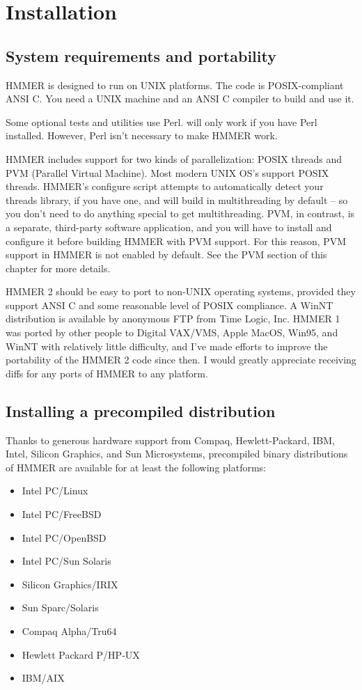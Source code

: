 \chapter{Installation}

\section{System requirements and portability}

HMMER is designed to run on UNIX platforms. The code is
POSIX-compliant ANSI C.  You need a UNIX machine and an ANSI C
compiler to build and use it.

Some optional tests and utilities use Perl.  will only
work if you have Perl installed. However, Perl isn't necessary to make
HMMER work.

HMMER includes support for two kinds of parallelization: POSIX threads
and PVM (Parallel Virtual Machine). Most modern UNIX OS's support
POSIX threads. HMMER's configure script attempts to automatically
detect your threads library, if you have one, and will build in
multithreading by default -- so you don't need to do anything special
to get multithreading. PVM, in contrast, is a separate, third-party
software application, and you will have to install and configure it
before building HMMER with PVM support. For this reason, PVM support
in HMMER is not enabled by default. See the PVM section of this
chapter for more details.

HMMER 2 should be easy to port to non-UNIX operating systems, provided
they support ANSI C and some reasonable level of POSIX compliance.  A
WinNT distribution is available by anonymous FTP from Time Logic,
Inc. HMMER 1 was ported by other people to Digital VAX/VMS, Apple
MacOS, Win95, and WinNT with relatively little difficulty, and I've
made efforts to improve the portability of the HMMER 2 code since
then. I would greatly appreciate receiving diffs for any ports of
HMMER to any platform.

\section{Installing a precompiled distribution}

Thanks to generous hardware support from Compaq, Hewlett-Packard, IBM,
Intel, Silicon Graphics, and Sun Microsystems, precompiled binary
distributions of HMMER are available for at least the following
platforms:
\begin{itemize}
\item Intel PC/Linux
\item Intel PC/FreeBSD
\item Intel PC/OpenBSD
\item Intel PC/Sun Solaris 
\item Silicon Graphics/IRIX
\item Sun Sparc/Solaris 
\item Compaq Alpha/Tru64
\item Hewlett Packard P/HP-UX
\item IBM/AIX
\end{itemize}

